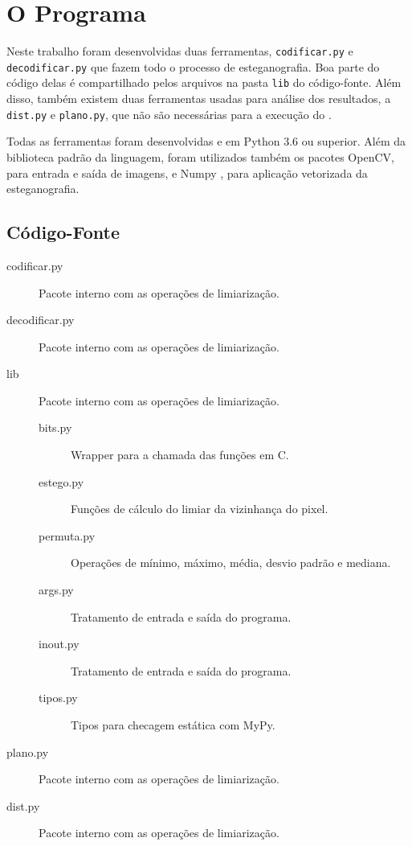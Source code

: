 \section{O Programa}

Neste trabalho foram desenvolvidas duas ferramentas, \texttt{codificar.py} e \texttt{decodificar.py} que fazem todo o processo de esteganografia. Boa parte do código delas é compartilhado pelos arquivos na pasta \texttt{lib} do código-fonte. Além disso, também existem duas ferramentas usadas para análise dos resultados, a \texttt{dist.py} e \texttt{plano.py}, que não são necessárias para a execução do .

Todas as ferramentas foram desenvolvidas e  em Python 3.6 ou superior. Além da biblioteca padrão da linguagem, foram utilizados também os pacotes OpenCV, para entrada e saída de imagens, e Numpy , para aplicação vetorizada da esteganografia.

\subsection{Código-Fonte}

    \begin{description}
        \item[codificar.py] Pacote interno com as operações de limiarização.

        \item[decodificar.py] Pacote interno com as operações de limiarização.

        \item[lib] Pacote interno com as operações de limiarização.

        \begin{description}
            \item[bits.py] Wrapper para a chamada das funções em C.

            \item[estego.py] Funções de cálculo do limiar da vizinhança do pixel.

            \item[permuta.py] Operações de mínimo, máximo, média, desvio padrão e mediana.

            \item[args.py] Tratamento de entrada e saída do programa.

            \item[inout.py] Tratamento de entrada e saída do programa.

            \item[tipos.py] Tipos para checagem estática com MyPy.
        \end{description}

        \item[plano.py] Pacote interno com as operações de limiarização.

        \item[dist.py] Pacote interno com as operações de limiarização.
    \end{description}
